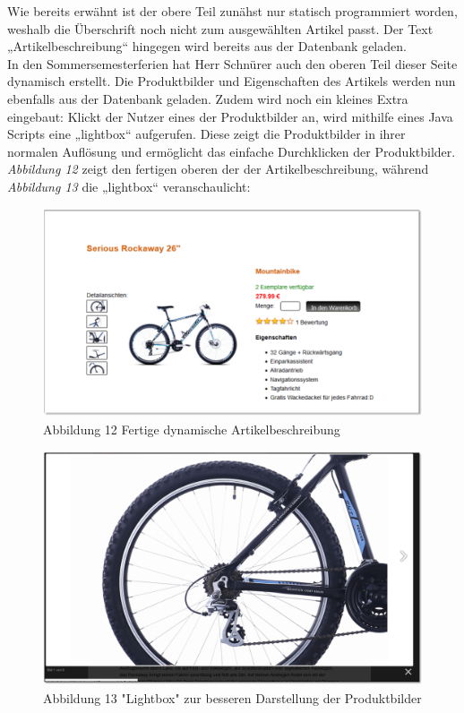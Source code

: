 Wie bereits erwähnt ist der obere Teil zunähst nur statisch programmiert worden, weshalb die Überschrift noch nicht zum ausgewählten Artikel passt. Der Text „Artikelbeschreibung“ hingegen wird bereits aus der Datenbank geladen.
\\
In den Sommersemesterferien hat Herr Schnürer auch den oberen Teil dieser Seite dynamisch erstellt. Die Produktbilder und Eigenschaften des Artikels werden nun ebenfalls aus der Datenbank geladen. Zudem wird noch ein kleines Extra eingebaut: Klickt der Nutzer eines der Produktbilder an, wird mithilfe eines Java Scripts eine „lightbox“ aufgerufen. Diese zeigt die Produktbilder in ihrer normalen Auflösung und ermöglicht das einfache Durchklicken der Produktbilder. \textit{Abbildung 12} zeigt den fertigen oberen der der Artikelbeschreibung, während \textit{Abbildung 13} die „lightbox“ veranschaulicht:

\begin{figure}[H]
\begin{center}
\includegraphics[width=150mm]{Bilder/Abbildung12-DynamischeDetailierteArtikelbeschreibungFertig.png}
\end{center}
\caption{Abbildung 12 Fertige dynamische Artikelbeschreibung}
\label{Abbildung12-Fertige dynamische Artikelbeschreibung}
\end{figure}

\begin{figure}[H]
\begin{center}
\includegraphics[width=150mm]{Bilder/Abbildung13-Lightbox.png}
\end{center}
\caption{Abbildung 13 "Lightbox" zur besseren Darstellung der Produktbilder}
\label{Abbildung13-"Lightbox" zur besseren Darstellung der Produktbilder}
\end{figure}

